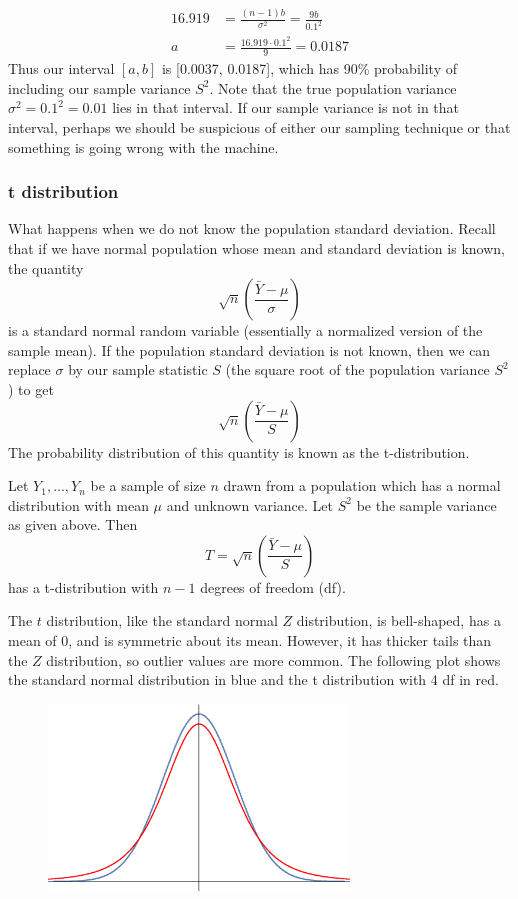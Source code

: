 \documentclass[notes.tex]{subfiles}
\begin{document}
\begin{align*}
16.919 &= \frac{(n-1)b}{\sigma^2} = \frac{9b}{0.1^2} \\
a &= \frac{16.919 \cdot 0.1^2}{9} = 0.0187
\end{align*}
Thus our interval $[a, b]$ is [0.0037, 0.0187], which has 90\% probability of including our sample variance $S^2$. Note that the true population variance $\sigma^2 = 0.1^2 = 0.01$ lies in that interval. If our sample variance is not in that interval, perhaps we should be suspicious of either our sampling technique or that something is going wrong with the machine.\\

\subsubsection{t distribution}
What happens when we do not know the population standard deviation. Recall that if we have normal population whose mean and standard deviation is known, the quantity
\[
\sqrt{n}\left( \frac{\bar{Y} - \mu}{\sigma }\right)
\] 
is a standard normal random variable (essentially a normalized version of the sample mean). If the population standard deviation is not known, then we can replace $\sigma$ by our sample statistic $S$ (the square root of the population variance $S^2$) to get
\[
\sqrt{n}\left( \frac{\bar{Y} - \mu}{ S }\right)
\]
The probability distribution of this quantity is known as the t-distribution.
\begin{framed}
Let $Y_1, \dots, Y_n$ be a sample of size $n$ drawn from a population which has a normal distribution with mean $\mu$ and unknown variance. Let $S^2$ be the sample variance as given above. Then
\[
T = \sqrt{n}\left( \frac{\bar{Y} - \mu}{ S }\right)
\]
has a t-distribution with $n-1$ degrees of freedom (df).
\end{framed}
The $t$ distribution, like the standard normal $Z$ distribution, is bell-shaped, has a mean of 0, and is symmetric about its mean. However, it has thicker tails than the $Z$ distribution, so outlier values are more common. The following plot shows the standard normal distribution in blue and the t distribution with 4 df in red.

\begin{figure}[H]
\centering
\includegraphics[width=8cm]{tvsz.eps}
\end{figure}
\end{document}
